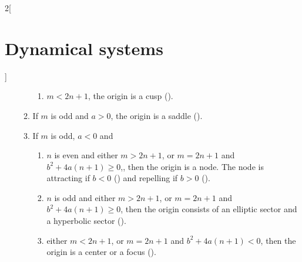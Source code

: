 \documentclass[../../../main_math.tex]{subfiles}
\begin{document}
\begin{multicols}{2}[\section{Dynamical systems}]
\begin{theorem}
\begin{enumerate}
\begin{enumerate}
\begin{enumerate}
                      \item $m <2n + 1$, the origin is a cusp ().
                    \end{enumerate}
              \item If $m$ is odd and $a >0$, the origin is a saddle ().
              \item If $m$ is odd, $a <0$ and
                    \begin{enumerate}
                      \item $n$ is even and either $m >2n + 1$, or  $m =2n + 1$ and $b^2+4a(n +1)\geq 0$,, then the origin is a node. The node is attracting if $b<0$ () and repelling if $b>0$ ().
                      \item $n$ is odd and either $m >2n + 1$, or  $m =2n + 1$ and $b^2+4a(n +1)\geq 0$, then the origin consists of an elliptic sector and a hyperbolic sector ().
                      \item either $m <2n + 1$, or  $m =2n + 1$ and $b^2+4a(n +1)< 0$, then the origin is a center or a focus ().
                    \end{enumerate}
            \end{enumerate}
    \end{enumerate}
    \begin{figure}[H]
      \centering
      \begin{subfigure}[b]{0.3\linewidth}
        \centering
        
        \caption{}
        \label{DS:nilpot-a}
      \end{subfigure}
      \hfill
      \begin{subfigure}[b]{0.3\linewidth}
        \centering
        
        \caption{}
        \label{DS:nilpot-b}
      \end{subfigure}
      \hfill
      \begin{subfigure}[b]{0.3\linewidth}
        \centering
        
        \caption{}
        \label{DS:nilpot-c}
      \end{subfigure}\\
      \begin{subfigure}[b]{0.3\linewidth}
        \centering
        

\end{subfigure}
\end{figure}
\end{theorem}
\end{multicols}
\end{document}
